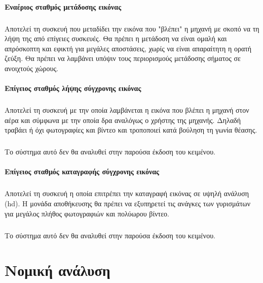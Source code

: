 \documentclass[a4paper, 12pt, twoside]{report}
\begin{document}
{{{{{{		
		\subsubsection{Εναέριος σταθμός μετάδοσης εικόνας}	
			\paragraph{}{Αποτελεί τη συσκευή που μεταδίδει την εικόνα που "βλέπει" η μηχανή με σκοπό να τη λήψη της από επίγειες συσκευές. Θα πρέπει η μετάδοση να είναι ομαλή και απρόσκοπτη και εφικτή για μεγάλες αποστάσεις, χωρίς να είναι απαραίτητη η ορατή ζεύξη. Θα πρέπει να λαμβάνει υπόψιν τους περιορισμούς μετάδοσης σήματος σε ανοιχτούς χώρους.
			}
		
		\subsubsection{Επίγειος σταθμός λήψης σύγχρονης εικόνας}	
			\paragraph{}{Αποτελεί τη συσκευή με την οποία λαμβάνεται η εικόνα που βλέπει η μηχανή στον αέρα και σύμφωνα με την οποία δρα αναλόγως ο χρήστης της μηχανής. Δηλαδή τραβάει ή όχι φωτογραφίες και βίντεο και τροποποιεί κατά βούληση τη γωνία θέασης.
			}
			\paragraph{}{Το σύστημα αυτό δεν θα αναλυθεί στην παρούσα έκδοση του κειμένου.}
			
		\subsubsection{Επίγειος σταθμός καταγραφής σύγχρονης εικόνας}
			\paragraph{}{Αποτελεί τη συσκευή η οποία επιτρέπει την καταγραφή εικόνας σε υψηλή ανάλυση (hd). Η μονάδα αποθήκευσης θα πρέπει να εξυπηρετεί τις ανάγκες των γυρισμάτων για μεγάλος πλήθος φωτογραφιών και πολύωρου βίντεο.
			}
			\paragraph{}{Το σύστημα αυτό δεν θα αναλυθεί στην παρούσα έκδοση του κειμένου.}
	
	\chapter{Νομική ανάλυση}
		
}}}}}}
\end{document}
